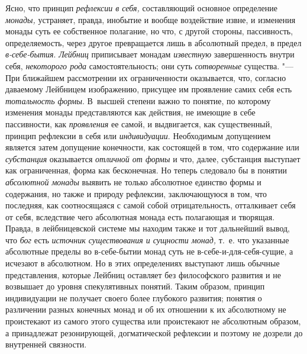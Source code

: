 Ясно, что принцип {\em рефлексии в себя,} составляющий
основное определение {\em монады,} устраняет, правда,
инобытие и вообще воздействие извне, и изменения монады суть ее собственное
полагание, но что, с другой стороны, пассивность, определяемость, через
другое превращается лишь в абсолютный предел, в предел
{\em в-себе-бытия}. {\em Лейбниц}
приписывает монадам {\em известную} завершенность
внутри себя, {\em некоторого рода} самостоятельность;
они суть {\em сотворенные} существа. "--- При ближайшем
рассмотрении их ограниченности оказывается, что, согласно даваемому
Лейбницем изображению, присущее им проявление самих себя есть
{\em тотальность формы}. В~высшей степени важно то
понятие, по которому изменения монады представляются как действия, не
имеющие в себе пассивности, как {\em проявления} ее
самой, и выдвигается, как существенный, принцип рефлексии в себя или
{\em индивидуации}. Необходимым допущением является
затем допущение конечности, как состоящей в том, что содержание или
{\em субстанция} оказывается {\em отличной от формы} и что, далее, субстанция
выступает как ограниченная, форма как бесконечная. Но теперь следовало бы в
понятии {\em абсолютной монады} выявить не только
абсолютное единство формы и содержания, но также и природу рефлексии,
заключающуюся в том, что последняя, как соотносящаяся с самой собой
отрицательность, отталкивает себя от себя, вследствие чего абсолютная
монада есть полагающая и творящая. Правда, в лейбницевской системе мы
находим также и тот дальнейший вывод, что {\em бог}
есть {\em источник существования и сущности монад,}
т.~е. что указанные абсолютные пределы во в-себе-бытии монад суть не
в-себе-и-для-себя-сущие, а исчезают в абсолютном. Но в этих определениях
выступают лишь обычные представления, которые Лейбниц оставляет без
философского развития и не возвышает до уровня спекулятивных понятий. Таким
образом, принцип индивидуации не получает своего более глубокого развития;
понятия о различении разных конечных монад и об их отношении к их
абсолютному не проистекают из самого этого существа или проистекают не
абсолютным образом, а принадлежат резонирующей, догматической рефлексии и
поэтому не дозрели до внутренней связности.


